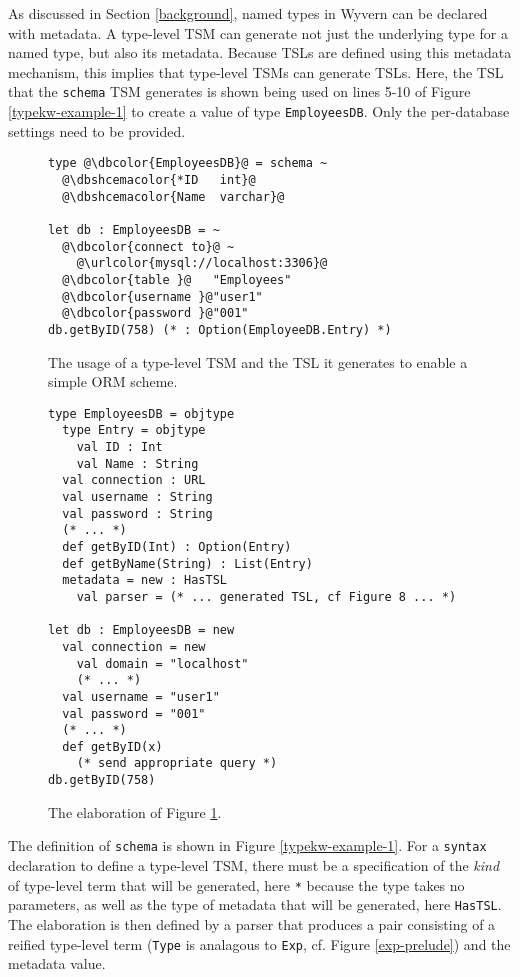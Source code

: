 \documentclass{sig-alternate}[10pt]
\newcommand{\urlcolor}[1]{\textcolor[HTML]{FFCC33}{#1}}
\newcommand{\dbcolor}[1]{\textcolor[HTML]{FF47FF}{#1}}
\newcommand{\dbshcemacolor}[1]{\textcolor[HTML]{5AC3D1}{#1}}
\newcommand{\mycaption}[1]{\vspace{-4px}\caption{#1}\vspace{-2px}}
\begin{document}
As discussed in Section \ref{background}, named types in Wyvern can be declared with  metadata. A type-level TSM can generate not just the underlying type for a named type, but also its metadata. Because TSLs are defined using this metadata mechanism, this implies that type-level TSMs can generate TSLs. Here, the TSL that the \verb|schema| TSM generates is shown being used on lines 5-10 of Figure \ref{typekw-example-1} to create a value of type \verb|EmployeesDB|. Only the per-database settings need to be provided. %

\begin{figure}[t]
\begin{lstlisting}[style=wyvern]
type @\dbcolor{EmployeesDB}@ = schema ~
  @\dbshcemacolor{*ID   int}@
  @\dbshcemacolor{Name  varchar}@

let db : EmployeesDB = ~
  @\dbcolor{connect to}@ ~
    @\urlcolor{mysql://localhost:3306}@
  @\dbcolor{table }@   "Employees"
  @\dbcolor{username }@"user1"
  @\dbcolor{password }@"001"
db.getByID(758) (* : Option(EmployeeDB.Entry) *)
\end{lstlisting}
\mycaption{The usage of a type-level TSM and the TSL it generates to enable a simple ORM scheme.}
\label{f-tykwexample}
\end{figure}

\begin{figure}[t]
\begin{lstlisting}[style=wyvern]
type EmployeesDB = objtype
  type Entry = objtype
    val ID : Int
    val Name : String 
  val connection : URL
  val username : String
  val password : String
  (* ... *)
  def getByID(Int) : Option(Entry)
  def getByName(String) : List(Entry)
  metadata = new : HasTSL
    val parser = (* ... generated TSL, cf Figure 8 ... *)

let db : EmployeesDB = new
  val connection = new
    val domain = "localhost"
    (* ... *)
  val username = "user1"
  val password = "001"
  (* ... *)
  def getByID(x)
    (* send appropriate query *)
db.getByID(758)
\end{lstlisting}
\mycaption{The elaboration of Figure \ref{f-tykwexample}.}
\label{typekw-example-2}
\end{figure}

The definition of \verb|schema| is shown in Figure \ref{typekw-example-1}. For a \verb|syntax| declaration to define a type-level TSM, there must be a specification of the \emph{kind} of type-level term that will be generated, here \verb|*| because the type takes no parameters, as well as the type of metadata that will be generated, here \verb|HasTSL|. The elaboration is then defined by a parser that produces a pair consisting of a reified type-level term (\verb|Type| is analagous to \verb|Exp|, cf. Figure \ref{exp-prelude}) and the metadata value.
\end{document}
